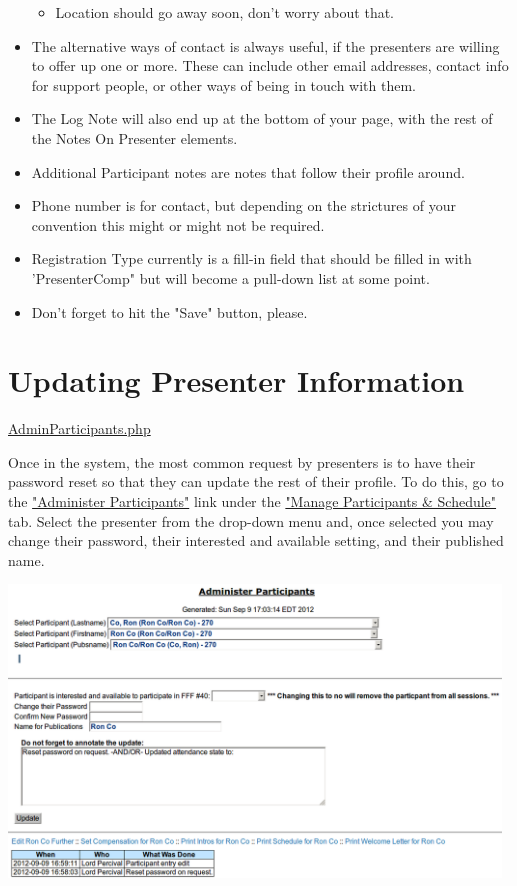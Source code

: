 \documentclass[captions=tablesignature]{scrartcl}
\begin{document}
\begin{itemize}
\begin{itemize}
\item Location should go away soon, don't worry about that.
\end{itemize}

\item The alternative ways of contact is always useful, if the
presenters are willing to offer up one or more.  These can
include other email addresses, contact info for support people,
or other ways of being in touch with them.

\item The Log Note will also end up at the bottom of your page, with
the rest of the Notes On Presenter elements.

\item Additional Participant notes are notes that follow their profile
around.

\item Phone number is for contact, but depending on the strictures of
your convention this might or might not be required.

\item Registration Type currently is a fill-in field that should be
filled in with 'PresenterComp" but will become a pull-down list
at some point.

\item Don't forget to hit the "Save" button, please.
\end{itemize}
\section{Updating Presenter Information}
\label{sec-3}
\href{../webpages/AdminParticipants.php}{AdminParticipants.php}

Once in the system, the most common request by presenters is to have
their password reset so that they can update the rest of their
profile.  To do this, go to the \href{../webpages/AdminParticipants.php}{"Administer Participants"} link under
the \href{../webpages/StaffManageParticipants.php}{"Manage Participants \& Schedule"} tab.  Select the presenter from
the drop-down menu and, once selected you may change their password,
their interested and available setting, and their published name.

\includegraphics[width=0.98\textwidth]{./Images/Administer_Participants.png}
\end{document}
